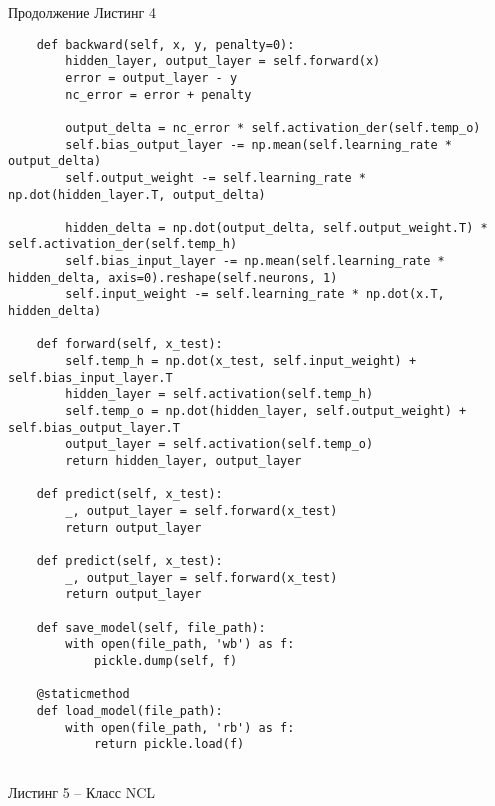 \documentclass[12pt]{extarticle}
\begin{document}
\newpage

Продолжение Листинг 4
            
\begin{lstlisting} 
    def backward(self, x, y, penalty=0):
        hidden_layer, output_layer = self.forward(x)
        error = output_layer - y
        nc_error = error + penalty

        output_delta = nc_error * self.activation_der(self.temp_o)
        self.bias_output_layer -= np.mean(self.learning_rate * output_delta)
        self.output_weight -= self.learning_rate * np.dot(hidden_layer.T, output_delta)

        hidden_delta = np.dot(output_delta, self.output_weight.T) * self.activation_der(self.temp_h)
        self.bias_input_layer -= np.mean(self.learning_rate * hidden_delta, axis=0).reshape(self.neurons, 1)
        self.input_weight -= self.learning_rate * np.dot(x.T, hidden_delta)

    def forward(self, x_test):
        self.temp_h = np.dot(x_test, self.input_weight) + self.bias_input_layer.T
        hidden_layer = self.activation(self.temp_h)
        self.temp_o = np.dot(hidden_layer, self.output_weight) + self.bias_output_layer.T
        output_layer = self.activation(self.temp_o)
        return hidden_layer, output_layer

    def predict(self, x_test):
        _, output_layer = self.forward(x_test)
        return output_layer

    def predict(self, x_test):
        _, output_layer = self.forward(x_test)
        return output_layer

    def save_model(self, file_path):
        with open(file_path, 'wb') as f:
            pickle.dump(self, f)

    @staticmethod
    def load_model(file_path):
        with open(file_path, 'rb') as f:
            return pickle.load(f)
        
\end{lstlisting}

\newpage

Листинг 5 -- Класс NCL
\end{document}
